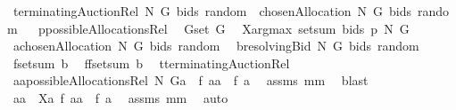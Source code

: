 \begin{isabellebody}
\ {\isachardoublequoteopen}terminatingAuctionRel\ N\ G\ {\isacharparenleft}bids{\isacharparenright}\ random\ {\isacharequal}\ {\isacharbraceleft}chosenAllocation{\isacharprime}\ N\ G\ bids\ random{\isacharbraceright}{\isachardoublequoteclose}\isanewline
%
\isadelimproof
%
\endisadelimproof
%
\isatagproof
{}\isamarkupfalse%
\ {\isacharminus}\isanewline
{}\isamarkupfalse%
\ {\isacharquery}p{\isacharequal}possibleAllocationsRel\ \isamarkupfalse%
\ {\isacharquery}G{\isacharequal}{\isachardoublequoteopen}set\ G{\isachardoublequoteclose}\ \isanewline
{}\isamarkupfalse%
\ {\isacharquery}X{\isacharequal}{\isachardoublequoteopen}argmax\ {\isacharparenleft}setsum\ bids{\isacharparenright}\ {\isacharparenleft}{\isacharquery}p\ N\ {\isacharquery}G{\isacharparenright}{\isachardoublequoteclose}\isanewline
{}\isamarkupfalse%
\ {\isacharquery}a{\isacharequal}{\isachardoublequoteopen}chosenAllocation{\isacharprime}\ N\ G\ bids\ random{\isachardoublequoteclose}\ \isamarkupfalse%
\ {\isacharquery}b{\isacharequal}{\isachardoublequoteopen}resolvingBid{\isacharprime}\ N\ G\ bids\ random{\isachardoublequoteclose}\isanewline
{}\isamarkupfalse%
\ {\isacharquery}f{\isacharequal}{\isachardoublequoteopen}setsum\ {\isacharquery}b{\isachardoublequoteclose}\ \isamarkupfalse%
\ {\isacharquery}ff{\isacharequal}{\isachardoublequoteopen}setsum\ {\isacharquery}b{\isachardoublequoteclose}\ \isanewline
{}\isamarkupfalse%
\ {\isacharquery}t{\isacharequal}terminatingAuctionRel\ \isamarkupfalse%
\ {\isachardoublequoteopen}{\isasymforall}aa{\isasymin}{\isacharparenleft}possibleAllocationsRel\ N\ {\isacharquery}G{\isacharparenright}{\isacharminus}{\isacharbraceleft}{\isacharquery}a{\isacharbraceright}{\isachardot}\ \ {\isacharquery}f\ aa\ {\isacharless}\ {\isacharquery}f\ {\isacharquery}a{\isachardoublequoteclose}\ \isanewline
{}\isamarkupfalse%
\ assms\ mm{}{}\ \isamarkupfalse%
\ blast\ \isamarkupfalse%
\ \isamarkupfalse%
\ \isanewline
{}{\isacharcolon}\ {\isachardoublequoteopen}{\isasymforall}aa\ {\isasymin}\ {\isacharquery}X{\isacharminus}{\isacharbraceleft}{\isacharquery}a{\isacharbraceright}{\isachardot}\ {\isacharquery}f\ aa\ {\isacharless}\ {\isacharquery}f\ {\isacharquery}a{\isachardoublequoteclose}\ \isamarkupfalse%
\ assms\ mm{}{}\ \isamarkupfalse%
\ auto\isanewline

\end{isabellebody}
